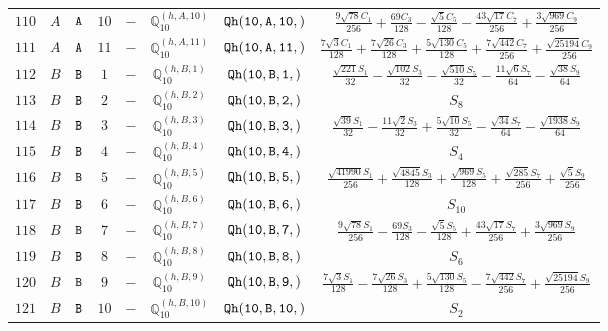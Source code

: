 \documentclass[fleqn,8pt]{jsarticle}
\begin{document}
\begin{table}[ht!]
\begin{center}
\begin{tabular}{cccccccc}
$ 110 $ & $ A $ & $ {\tt A} $ & $ 10 $ & $ - $ & $ \mathbb{Q}_{10}^{(h,A,10)} $ & $ {\tt Qh(10,A,10,)} $ & $ \frac{9 \sqrt{78} C_{1}}{256} + \frac{69 C_{3}}{128} - \frac{\sqrt{5} C_{5}}{128} - \frac{43 \sqrt{17} C_{7}}{256} + \frac{3 \sqrt{969} C_{9}}{256} $ \\
$ 111 $ & $ A $ & $ {\tt A} $ & $ 11 $ & $ - $ & $ \mathbb{Q}_{10}^{(h,A,11)} $ & $ {\tt Qh(10,A,11,)} $ & $ \frac{7 \sqrt{3} C_{1}}{128} + \frac{7 \sqrt{26} C_{3}}{128} + \frac{5 \sqrt{130} C_{5}}{128} + \frac{7 \sqrt{442} C_{7}}{256} + \frac{\sqrt{25194} C_{9}}{256} $ \\
$ 112 $ & $ B $ & $ {\tt B} $ & $ 1 $ & $ - $ & $ \mathbb{Q}_{10}^{(h,B,1)} $ & $ {\tt Qh(10,B,1,)} $ & $ \frac{\sqrt{221} S_{1}}{32} - \frac{\sqrt{102} S_{3}}{32} - \frac{\sqrt{510} S_{5}}{32} - \frac{11 \sqrt{6} S_{7}}{64} - \frac{\sqrt{38} S_{9}}{64} $ \\
$ 113 $ & $ B $ & $ {\tt B} $ & $ 2 $ & $ - $ & $ \mathbb{Q}_{10}^{(h,B,2)} $ & $ {\tt Qh(10,B,2,)} $ & $ S_{8} $ \\
$ 114 $ & $ B $ & $ {\tt B} $ & $ 3 $ & $ - $ & $ \mathbb{Q}_{10}^{(h,B,3)} $ & $ {\tt Qh(10,B,3,)} $ & $ \frac{\sqrt{39} S_{1}}{32} - \frac{11 \sqrt{2} S_{3}}{32} + \frac{5 \sqrt{10} S_{5}}{32} - \frac{\sqrt{34} S_{7}}{64} - \frac{\sqrt{1938} S_{9}}{64} $ \\
$ 115 $ & $ B $ & $ {\tt B} $ & $ 4 $ & $ - $ & $ \mathbb{Q}_{10}^{(h,B,4)} $ & $ {\tt Qh(10,B,4,)} $ & $ S_{4} $ \\
$ 116 $ & $ B $ & $ {\tt B} $ & $ 5 $ & $ - $ & $ \mathbb{Q}_{10}^{(h,B,5)} $ & $ {\tt Qh(10,B,5,)} $ & $ \frac{\sqrt{41990} S_{1}}{256} + \frac{\sqrt{4845} S_{3}}{128} + \frac{\sqrt{969} S_{5}}{128} + \frac{\sqrt{285} S_{7}}{256} + \frac{\sqrt{5} S_{9}}{256} $ \\
$ 117 $ & $ B $ & $ {\tt B} $ & $ 6 $ & $ - $ & $ \mathbb{Q}_{10}^{(h,B,6)} $ & $ {\tt Qh(10,B,6,)} $ & $ S_{10} $ \\
$ 118 $ & $ B $ & $ {\tt B} $ & $ 7 $ & $ - $ & $ \mathbb{Q}_{10}^{(h,B,7)} $ & $ {\tt Qh(10,B,7,)} $ & $ \frac{9 \sqrt{78} S_{1}}{256} - \frac{69 S_{3}}{128} - \frac{\sqrt{5} S_{5}}{128} + \frac{43 \sqrt{17} S_{7}}{256} + \frac{3 \sqrt{969} S_{9}}{256} $ \\
$ 119 $ & $ B $ & $ {\tt B} $ & $ 8 $ & $ - $ & $ \mathbb{Q}_{10}^{(h,B,8)} $ & $ {\tt Qh(10,B,8,)} $ & $ S_{6} $ \\
$ 120 $ & $ B $ & $ {\tt B} $ & $ 9 $ & $ - $ & $ \mathbb{Q}_{10}^{(h,B,9)} $ & $ {\tt Qh(10,B,9,)} $ & $ \frac{7 \sqrt{3} S_{1}}{128} - \frac{7 \sqrt{26} S_{3}}{128} + \frac{5 \sqrt{130} S_{5}}{128} - \frac{7 \sqrt{442} S_{7}}{256} + \frac{\sqrt{25194} S_{9}}{256} $ \\
$ 121 $ & $ B $ & $ {\tt B} $ & $ 10 $ & $ - $ & $ \mathbb{Q}_{10}^{(h,B,10)} $ & $ {\tt Qh(10,B,10,)} $ & $ S_{2} $ \\
 \hline \hline
\end{tabular}
\end{center}
\end{table}
\end{document}

